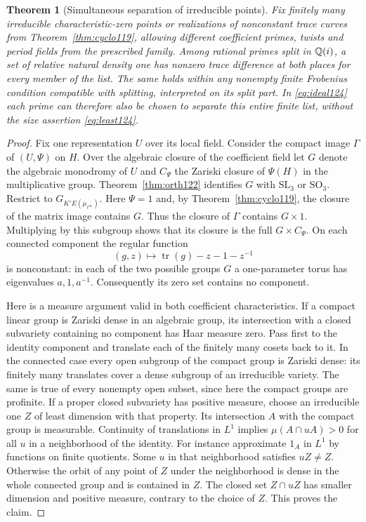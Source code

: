 \documentclass[a4paper,11pt]{article}
\newtheorem{theorem}[proposition]{Theorem}
\theoremstyle{definition}
\theoremstyle{remark}
\numberwithin{equation}{section}
\begin{document}
\begin{theorem}[Simultaneous separation of irreducible points]
\label{thm:dense124}
Fix finitely many irreducible characteristic-zero points or
realizations of nonconstant trace curves from
Theorem~\ref{thm:cyclo119}, allowing different coefficient
primes, twists and period fields from the prescribed family.
Among rational primes split in \(\mathbb Q(i)\), a set of relative
natural density one has nonzero trace difference at both
places for every member of the list. The same holds within
any nonempty finite Frobenius condition compatible with
splitting, interpreted on its split part. In \eqref{eq:ideal124} each prime
can therefore also be chosen to separate this entire finite
list, without the size assertion \eqref{eq:least124}.
\end{theorem}
\begin{proof}
Fix one representation \(U\) over its local field. Consider
the compact image \(\Gamma\) of \((U,\Psi)\) on \(H\). Over
the algebraic closure of the coefficient field let \(G\)
denote the algebraic monodromy of \(U\) and \(C_\Psi\) the
Zariski closure of \(\Psi(H)\) in the multiplicative group.
Theorem~\ref{thm:orth122} identifies \(G\) with
\(\mathrm{SL}_3\) or \(\mathrm{SO}_3\). Restrict to
\(G_{K'E(\mu_{\ell^\infty})}\). Here \(\Psi=1\) and, by
Theorem~\ref{thm:cyclo119}, the closure of the matrix image
contains \(G\). Thus the closure of \(\Gamma\) contains
\(G\times1\). Multiplying by this subgroup shows that its
closure is the full \(G\times C_\Psi\).
On each connected component the regular function
\[
                     (g,z)\longmapsto
                 \operatorname{tr}(g)-z-1-z^{-1}
\]
is nonconstant: in each of the two possible groups \(G\)
a one-parameter torus has eigenvalues \(a,1,a^{-1}\).
Consequently its zero set contains no component.

Here is a measure argument valid in both coefficient
characteristics. If a compact linear group is Zariski dense
in an algebraic group, its intersection with a closed
subvariety containing no component has Haar measure zero.
Pass first to the identity component and translate each
of the finitely many cosets back to it. In the connected
case every open subgroup of the compact group is Zariski
dense: its finitely many translates cover a dense subgroup
of an irreducible variety. The same is true of every nonempty
open subset, since here the compact groups are profinite.
If a proper closed subvariety has positive measure, choose an
irreducible one \(Z\) of least dimension with that property.
Its intersection \(A\) with the compact group is measurable.
Continuity of translations in \(L^1\) implies
\(\mu(A\cap uA)>0\) for all \(u\) in a neighborhood of
the identity. For instance approximate \(1_A\) in \(L^1\)
by functions on finite quotients. Some \(u\) in that
neighborhood satisfies \(uZ\ne Z\). Otherwise the orbit of
any point of \(Z\) under the neighborhood is dense in the
whole connected group and is contained in \(Z\). The closed
set \(Z\cap uZ\) has smaller dimension and positive measure,
contrary to the choice of \(Z\). This proves the claim.


\end{proof}
\end{document}
